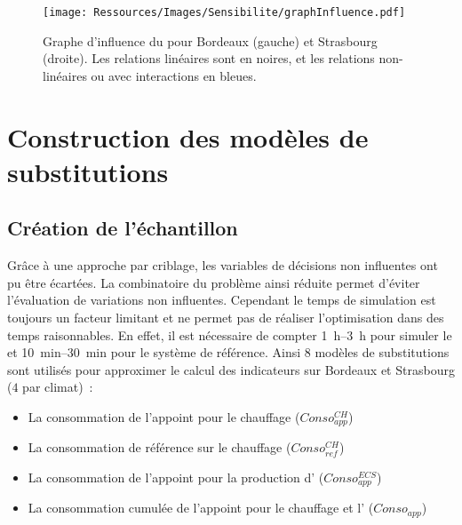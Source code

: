 \begin{figure}
    \centering
    \texttt{[image: Ressources/Images/Sensibilite/graphInfluence.pdf]}
    \caption[Graphe d’influence du  pour Bordeaux et Strasbourg]
            {Graphe d’influence du  pour Bordeaux (gauche) et Strasbourg (droite). Les
             relations linéaires sont en noires, et les relations non-linéaires ou
             avec interactions en bleues.}
    \label{fig:graphe_influence_objectifs}
\end{figure}






\section{Construction des modèles de substitutions} %
\label{sec:construction_des_modeles_de_substitutions}
\subsection{Création de l’échantillon} %
\label{sub:creation_de_l_echantillon}
Grâce à une approche par criblage, les variables de décisions non influentes ont pu être
écartées. La combinatoire du problème ainsi réduite permet d’éviter l’évaluation de variations non influentes.
Cependant le temps de simulation est toujours un facteur limitant et ne permet pas
de réaliser l’optimisation dans des temps raisonnables. En effet, il est nécessaire de
compter \SIrange{1}{3}{h} pour simuler le  et \SIrange{10}{30}{min} pour
le système de référence.
Ainsi $8$ modèles de substitutions sont utilisés pour approximer le calcul des indicateurs
sur Bordeaux et Strasbourg ($4$ par climat)~:
\begin{itemize}
  \item La consommation de l’appoint pour le chauffage ($Conso_{app}^{CH}$)
  \item La consommation de référence sur le chauffage ($Conso_{ref}^{CH}$)
  \item La consommation de l’appoint pour la production d’ ($Conso_{app}^{ECS}$)
  \item La consommation cumulée de l’appoint pour le chauffage et l’ ($Conso_{app}$)
\end{itemize}

